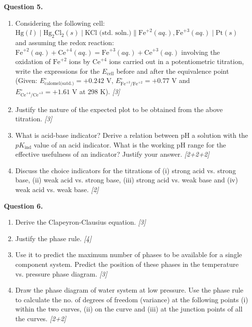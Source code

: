 \documentclass[11pt,a4paper]{article}
\newcommand{\pts}[1]{\hfill \textit{[#1]}}
\begin{document}
\noindent \textbf{Question 5.}
\begin{enumerate}[label=(\alph*)]
  \item Considering the following cell: $\text{Hg}(l) \mid \text{Hg}_2\text{Cl}_2(s) \mid \text{KCl (std. soln.)} \parallel \text{Fe}^{+2}(aq.), \text{Fe}^{+3}(aq.) \mid \text{Pt}(s)$ and assuming the redox reaction: $\text{Fe}^{+2}(aq.) + \text{Ce}^{+4}(aq.) = \text{Fe}^{+3}(aq.) + \text{Ce}^{+3}(aq.)$ involving the oxidation of $\text{Fe}^{+2}$ ions by $\text{Ce}^{+4}$ ions carried out in a potentiometric titration, write the expressions for the $E_{\text{cell}}$ before and after the equivalence point (Given: $E_{\text{calomel(satd.)}}^\circ = +0.242\text{ V}$, $E_{\text{Fe}^{+3}/\text{Fe}^{+2}}^\circ = +0.77\text{ V}$ and $E_{\text{Ce}^{+4}/\text{Ce}^{+3}}^\circ = +1.61\text{ V}$ at 298 K). \pts{3}
  \item Justify the nature of the expected plot to be obtained from the above titration. \pts{3}
  \item What is acid-base indicator? Derive a relation between pH a solution with the $pK_{\text{ind}}$ value of an acid indicator. What is the working pH range for the effective usefulness of an indicator? Justify your answer. \pts{2+2+2}
  \item Discuss the choice indicators for the titrations of (i) strong acid vs. strong base, (ii) weak acid vs. strong base, (iii) strong acid vs. weak base and (iv) weak acid vs. weak base. \pts{2}
\end{enumerate}

\bigskip

\noindent \textbf{Question 6.}
\begin{enumerate}[label=(\alph*)]
  \item Derive the Clapeyron-Clausius equation. \pts{3}
  \item Justify the phase rule. \pts{4}
  \item Use it to predict the maximum number of phases to be available for a single component system. Predict the position of these phases in the temperature vs. pressure phase diagram. \pts{3}
  \item Draw the phase diagram of water system at low pressure. Use the phase rule to calculate the no. of degrees of freedom (variance) at the following points (i) within the two curves, (ii) on the curve and (iii) at the junction points of all the curves. \pts{2+2}
\end{enumerate}

\bigskip
\end{document}
